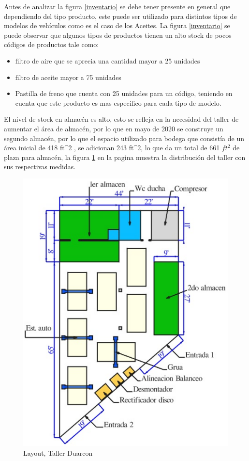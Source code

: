 \documentclass[a4papper,11pt]{article}
\begin{document}
    Antes de analizar la figura \ref{inventario} se debe tener presente en general que dependiendo del tipo producto, este puede ser utilizado para distintos tipos de modelos de vehículos como es el caso de los Aceites. La figura \ref{inventario} se puede observar que algunos tipos de productos tienen un alto stock de pocos códigos de productos tale como:
    \begin{itemize}
      \item filtro de aire que se aprecia una cantidad mayor a 25 unidades
      \item filtro de aceite mayor a 75 unidades
      \item Pastilla de freno que cuenta con 25 unidades para un código, teniendo en cuenta que este producto es mas especifico para cada tipo de modelo.
    \end{itemize}

    El nivel de stock en almacén es alto, esto se refleja en la necesidad del taller de aumentar el área de almacén, por lo que en mayo de 2020 se construye un segundo almacén, por lo que el espacio utilizado para bodega que consistía de un área inicial de 418 ft^2 , se adicionan 243 ft^2, lo que da un total de 661 $ft^2$ de plaza para almacén, la figura \ref{layout} en la pagina \pageref{layout}  muestra la distribución del taller con sus respectivas medidas. 
      \begin{figure}[h]
      \centering
      \includegraphics[width=\textwidth]{plan.png}
      \caption{Layout, Taller Duarcon}
      \label{layout}
      \end{figure}
\end{document}
